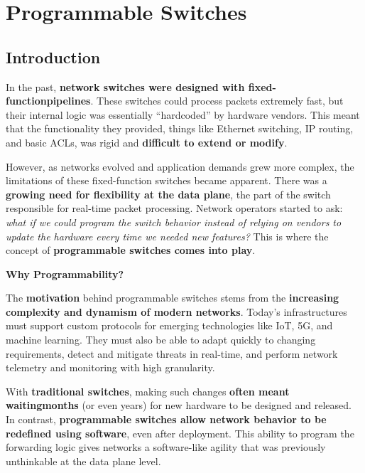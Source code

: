 \section{Programmable Switches}\label{section: Programmable Switches}

\subsection{Introduction}

In the past, \textbf{network switches were designed with fixed-function\break pipelines}. These switches could process packets extremely fast, but their internal logic was essentially ``hardcoded'' by hardware vendors. This meant that the functionality they provided, things like Ethernet switching, IP routing, and basic ACLs, was rigid and \textbf{difficult to extend or modify}.

\highspace
However, as networks evolved and application demands grew more complex, the limitations of these fixed-function switches became apparent. There was a \textbf{growing need for flexibility at the data plane}, the part of the switch responsible for real-time packet processing. Network operators started to ask: \emph{what if we could \emph{program} the switch behavior instead of relying on vendors to update the hardware every time we needed new features?} This is where the concept of \textbf{programmable switches comes into play}.

\highspace
\begin{flushleft}
    \textcolor{Green3}{ \textbf{Why Programmability?}}
\end{flushleft}
The \textbf{motivation} behind programmable switches stems from the \textbf{increasing complexity and dynamism of modern networks}. Today's infrastructures must support custom protocols for emerging technologies like IoT, 5G, and machine learning. They must also be able to adapt quickly to changing requirements, detect and mitigate threats in real-time, and perform network telemetry and monitoring with high granularity.

\highspace
With \textbf{traditional switches}, making such changes \textbf{often meant waiting\break months} (or even years) for new hardware to be designed and released. In contrast, \textbf{programmable switches allow network behavior to be redefined using software}, even after deployment. This ability to program the forwarding logic gives networks a software-like agility that was previously unthinkable at the data plane level.

